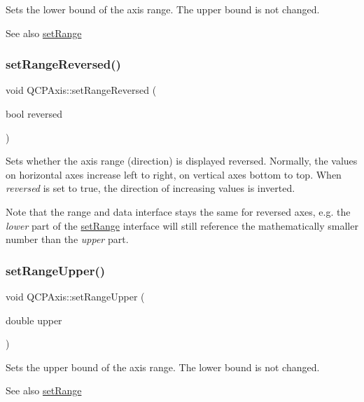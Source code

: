Sets the lower bound of the axis range. The upper bound is not changed. \begin{DoxySeeAlso}{See also}
\hyperlink{class_q_c_p_axis_aebdfea5d44c3a0ad2b4700cd4d25b641}{set\+Range} 
\end{DoxySeeAlso}
\mbox{\label{class_q_c_p_axis_a2172fdb196b1a0dc3f40992fcad8e9e1}} 
\subsubsection{\texorpdfstring{set\+Range\+Reversed()}{setRangeReversed()}}
{\footnotesize\ttfamily void Q\+C\+P\+Axis\+::set\+Range\+Reversed (\begin{DoxyParamCaption}\item[{bool}]{reversed }\end{DoxyParamCaption})}

Sets whether the axis range (direction) is displayed reversed. Normally, the values on horizontal axes increase left to right, on vertical axes bottom to top. When {\itshape reversed} is set to true, the direction of increasing values is inverted.

Note that the range and data interface stays the same for reversed axes, e.\+g. the {\itshape lower} part of the \hyperlink{class_q_c_p_axis_aebdfea5d44c3a0ad2b4700cd4d25b641}{set\+Range} interface will still reference the mathematically smaller number than the {\itshape upper} part. \mbox{\label{class_q_c_p_axis_acd3ca1247aa867b540cd5ec30ccd3bef}} 
\subsubsection{\texorpdfstring{set\+Range\+Upper()}{setRangeUpper()}}
{\footnotesize\ttfamily void Q\+C\+P\+Axis\+::set\+Range\+Upper (\begin{DoxyParamCaption}\item[{double}]{upper }\end{DoxyParamCaption})}

Sets the upper bound of the axis range. The lower bound is not changed. \begin{DoxySeeAlso}{See also}
\hyperlink{class_q_c_p_axis_aebdfea5d44c3a0ad2b4700cd4d25b641}{set\+Range} 
\end{DoxySeeAlso}
\mbox{\label{class_q_c_p_axis_af4bbd446dcaee5a83ac30ce9bcd6e125}} 
